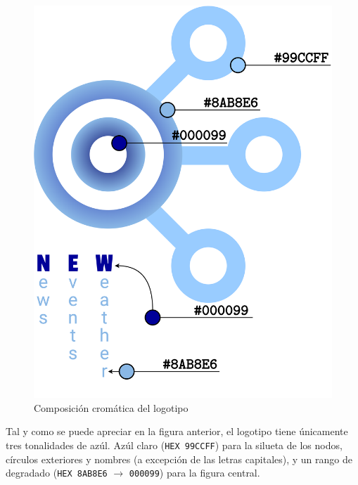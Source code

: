 \documentclass[../ei103948-project-documentation.tex]{subfiles}
\begin{document}
                            \begin{figure}[H]
                                \begin{center}
                                \includegraphics[scale=0.09]{images/LogoCromatico.png}
                                \end{center}
                                \caption{Composición cromática del logotipo}
                            \end{figure}

                            \newpage
                    
                            Tal y como se puede apreciar en la figura anterior, el logotipo tiene únicamente tres tonalidades de azúl. Azúl claro (\texttt{HEX 99CCFF}) para la silueta de los nodos, círculos exteriores y nombres (a excepción de las letras capitales), y un rango de degradado (\texttt{HEX 8AB8E6} $\rightarrow$ \texttt{000099}) para la figura central.\\
\end{document}
